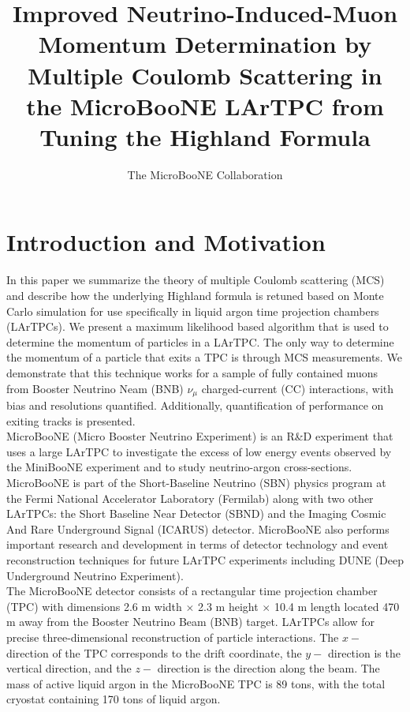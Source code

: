 \documentclass[a4paper,11pt]{article}
\author{The MicroBooNE Collaboration}
\title{Improved Neutrino-Induced-Muon Momentum Determination by Multiple Coulomb Scattering in the MicroBooNE LArTPC from Tuning the Highland Formula}
\begin{document}
\maketitle
\flushbottom

\section{Introduction and Motivation}\label{sec:intro}

In this paper we summarize the theory of multiple Coulomb scattering (MCS) and describe how the underlying Highland formula is retuned based on Monte Carlo simulation for use specifically in liquid argon time projection chambers (LArTPCs). We present a maximum likelihood based algorithm that is used to determine the momentum of particles in a LArTPC. The only way to determine the momentum of a particle that exits a TPC is through MCS measurements. We demonstrate that this technique works for a sample of fully contained muons from Booster Neutrino Neam (BNB) $\nu_\mu$ charged-current (CC) interactions, with bias and resolutions quantified. Additionally, quantification of performance on exiting tracks is presented.\\

MicroBooNE (Micro Booster Neutrino Experiment) is an R\&D experiment that uses a large LArTPC to investigate the excess of low energy events observed by the MiniBooNE experiment \cite{Aguilar-Arevalo:2013pmq} and to study neutrino-argon cross-sections. MicroBooNE is part of the Short-Baseline Neutrino (SBN) \cite{SBNwhitepaper} physics program at the Fermi National Accelerator Laboratory (Fermilab) along with two other LArTPCs: the Short Baseline Near Detector (SBND) and the Imaging Cosmic And Rare Underground Signal (ICARUS) detector. MicroBooNE also performs important research and development in terms of detector technology and event reconstruction techniques for future LArTPC experiments including DUNE (Deep Underground Neutrino Experiment).\\


The MicroBooNE detector \cite{ub_detectorpaper} consists of a rectangular time projection chamber (TPC) with dimensions 2.6 m width $\times$ 2.3 m height $\times$ 10.4 m length located 470 m away from the Booster Neutrino Beam (BNB) target. LArTPCs allow for precise three-dimensional reconstruction of particle interactions. The $x-$ direction of the TPC corresponds to the drift coordinate, the $y-$ direction is the vertical direction, and the $z-$ direction is the direction along the beam. The mass of active liquid argon in the MicroBooNE TPC is 89 tons, with the total cryostat containing 170 tons of liquid argon.\\
\end{document}
